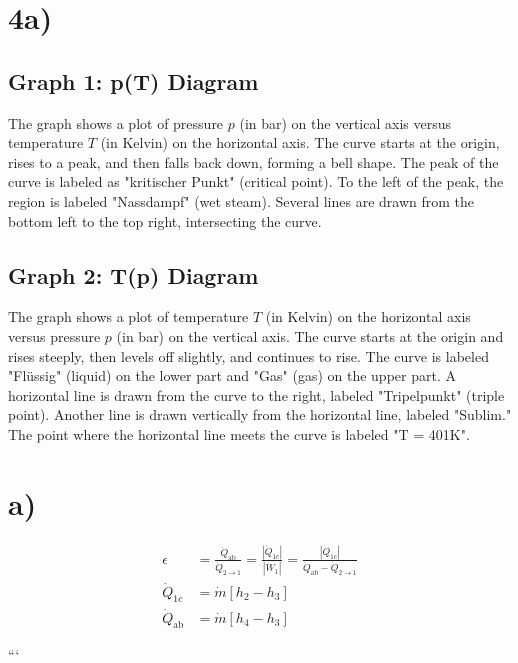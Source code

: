 

\section*{4a)}

\subsection*{Graph 1: p(T) Diagram}
The graph shows a plot of pressure \( p \) (in bar) on the vertical axis versus temperature \( T \) (in Kelvin) on the horizontal axis. The curve starts at the origin, rises to a peak, and then falls back down, forming a bell shape. The peak of the curve is labeled as "kritischer Punkt" (critical point). To the left of the peak, the region is labeled "Nassdampf" (wet steam). Several lines are drawn from the bottom left to the top right, intersecting the curve.

\subsection*{Graph 2: T(p) Diagram}
The graph shows a plot of temperature \( T \) (in Kelvin) on the horizontal axis versus pressure \( p \) (in bar) on the vertical axis. The curve starts at the origin and rises steeply, then levels off slightly, and continues to rise. The curve is labeled "Flüssig" (liquid) on the lower part and "Gas" (gas) on the upper part. A horizontal line is drawn from the curve to the right, labeled "Tripelpunkt" (triple point). Another line is drawn vertically from the horizontal line, labeled "Sublim." The point where the horizontal line meets the curve is labeled "T = 401K".



\section*{a)}

\begin{align*}
\epsilon &= \frac{\dot{Q}_{\text{ab}}}{\dot{Q}_{2 \rightarrow 1}} = \frac{\left| \dot{Q}_{1c} \right|}{\left| \dot{W}_1 \right|} = \frac{\left| \dot{Q}_{1c} \right|}{\dot{Q}_{\text{ab}} - \dot{Q}_{2 \rightarrow 1}} \\
\dot{Q}_{1c} &= \dot{m} \left[ h_2 - h_3 \right] \\
\dot{Q}_{\text{ab}} &= \dot{m} \left[ h_4 - h_3 \right]
\end{align*}

```